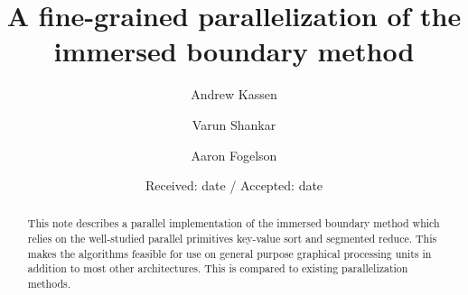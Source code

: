 \pgfplotsset{compat=newest}
\usetikzlibrary{patterns,shapes,backgrounds,calc}

\makeatletter
{}
\def\cl@chapter{\@elt {theorem}}
\makeatother

%
%
%


\title{%
    A fine-grained parallelization of the immersed boundary method
}


\author{Andrew Kassen \and Varun Shankar \and Aaron Fogelson}

\authorrunning{}


\date{Received: date / Accepted: date}


\maketitle

\begin{abstract}
    This note describes a parallel implementation of the immersed
    boundary method which relies on the well-studied parallel primitives
    key-value sort and segmented reduce. This makes the algorithms feasible for
    use on general purpose graphical processing units in addition to most other
    architectures. This is compared to existing parallelization methods.

\end{abstract}

